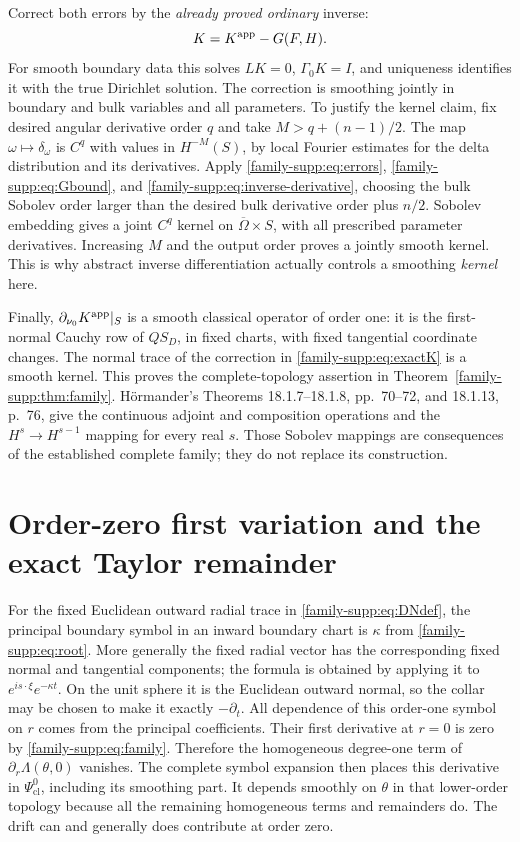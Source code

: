 \documentclass[11pt]{article}
\theoremstyle{definition}
\theoremstyle{remark}
\numberwithin{equation}{section}
\providecommand{\Ps}{\Psi_{\mathrm{cl}}}
\providecommand{\tht}{\theta}
\begin{document}
Correct both errors by the \emph{already proved ordinary} inverse:
\begin{equation}\label{family-supp:eq:exactK}
 K=K^{\rm app}-G(F,H).
\end{equation}
For smooth boundary data this solves $LK=0$, $\Gamma_0K=I$, and uniqueness
identifies it with the true Dirichlet solution. The correction is smoothing
jointly in boundary and bulk variables and all parameters. To justify
the kernel claim, fix desired angular derivative order $q$ and take
$M>q+(n-1)/2$. The map $\omega\mapsto\delta_\omega$ is $C^q$ with
values in $H^{-M}(S)$, by local Fourier estimates for the delta distribution
and its derivatives. Apply \eqref{family-supp:eq:errors}, \eqref{family-supp:eq:Gbound}, and
\eqref{family-supp:eq:inverse-derivative}, choosing the bulk Sobolev order larger than
the desired bulk derivative order plus $n/2$. Sobolev embedding gives
a joint $C^q$ kernel on $\overline\Omega\times S$, with all prescribed
parameter derivatives. Increasing $M$ and the output order proves a
jointly smooth kernel. This is why abstract inverse differentiation
actually controls a smoothing \emph{kernel} here.

Finally, $\partial_{\nu_0}K^{\rm app}|_S$ is a smooth classical operator
of order one: it is the first-normal Cauchy row of $QS_D$, in fixed
charts, with fixed tangential coordinate changes. The normal trace of
the correction in \eqref{family-supp:eq:exactK} is a smooth kernel. This proves the
complete-topology assertion in Theorem~\ref{family-supp:thm:family}. H\"ormander's
Theorems 18.1.7--18.1.8, pp.~70--72, and 18.1.13, p.~76, give the continuous
adjoint and composition operations and the $H^s\to H^{s-1}$ mapping for
every real $s$. Those Sobolev mappings are consequences of the established
complete family; they do not replace its construction.

\section{Order-zero first variation and the exact Taylor remainder}
\label{family-supp:sec:variation}

For the fixed Euclidean outward radial trace in \eqref{family-supp:eq:DNdef}, the
principal boundary symbol in an inward boundary chart is $\kappa$ from
\eqref{family-supp:eq:root}. More generally the fixed radial vector has the corresponding
fixed normal and tangential components; the formula is obtained by
applying it to $e^{is\cdot\xi}e^{-\kappa t}$. On the unit sphere it is the
Euclidean outward normal, so the collar may be chosen to make it exactly
$-\partial_t$. All dependence of this order-one symbol on $r$ comes from
the principal coefficients. Their first derivative at $r=0$ is zero by
\eqref{family-supp:eq:family}. Therefore the homogeneous degree-one term of
$\partial_r\Lambda(\tht,0)$ vanishes. The complete symbol expansion
then places this derivative in $\Ps^0$, including its smoothing part.
It depends smoothly on $\tht$ in that lower-order topology because all
the remaining homogeneous terms and remainders do. The drift can and
generally does contribute at order zero.
\end{document}
